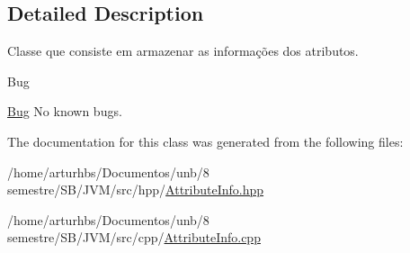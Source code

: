 \subsection{Detailed Description}
Classe que consiste em armazenar as informações dos atributos. 

\begin{DoxyRefDesc}{Bug}
\item[\hyperlink{bug__bug000004}{Bug}]No known bugs. \end{DoxyRefDesc}


The documentation for this class was generated from the following files\+:\begin{DoxyCompactItemize}
\item 
/home/arturhbs/\+Documentos/unb/8 semestre/\+S\+B/\+J\+V\+M/src/hpp/\hyperlink{AttributeInfo_8hpp}{Attribute\+Info.\+hpp}\item 
/home/arturhbs/\+Documentos/unb/8 semestre/\+S\+B/\+J\+V\+M/src/cpp/\hyperlink{AttributeInfo_8cpp}{Attribute\+Info.\+cpp}\end{DoxyCompactItemize}
